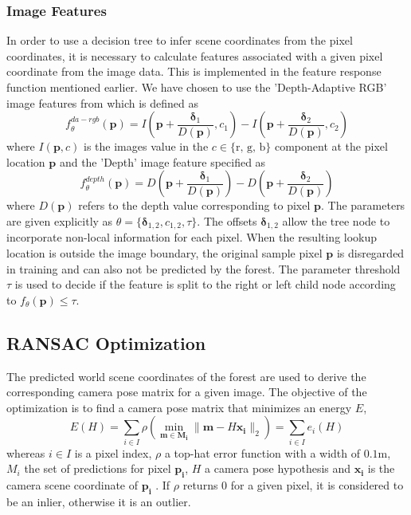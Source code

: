 \documentclass[final]{cvpr}
\begin{document}
\subsubsection{Image Features}
In order to use a decision tree to infer scene coordinates from the pixel coordinates,
it is necessary to calculate features associated with a given pixel coordinate from the
image data. This is implemented in the feature response function mentioned earlier.
We have chosen to use the 'Depth-Adaptive RGB' image features from \cite{shotton2013} which
is defined as
\begin{equation}
	f_{\theta}^{da-rgb}(\boldsymbol{p}) = I\left(\boldsymbol{p} + \frac{\boldsymbol{\delta}_1}{D(\boldsymbol{p})}, c_1\right)
	- I\left(\boldsymbol{p} + \frac{\boldsymbol{\delta}_2}{D(\boldsymbol{p})}, c_2\right)
\end{equation}
where $I(\boldsymbol{p}, c)$ is the images value in the $c \in \{\text{r, g, b}\}$ component at
the pixel location $\boldsymbol{p}$ and the 'Depth' image feature specified as
\begin{equation}
	f_{\theta}^{depth}(\boldsymbol{p}) = D\left(\boldsymbol{p} + \frac{\boldsymbol{\delta}_1}{D(\boldsymbol{p})}\right)
	- D\left(\boldsymbol{p} + \frac{\boldsymbol{\delta}_2}{D(\boldsymbol{p})}\right)
\end{equation}
where $D(\boldsymbol{p})$ refers to the depth value corresponding to pixel $\boldsymbol{p}$.
The parameters are given explicitly as $\theta = \{\boldsymbol{\delta}_{1,2}, c_{1,2}, \tau\}$. 
The offsets $\boldsymbol{\delta}_{1,2}$
allow the tree node to incorporate non-local information for each pixel. When the resulting
lookup location is outside the image boundary, the original sample pixel $\boldsymbol{p}$ is
disregarded in training and can also not be predicted by the forest. The parameter threshold 
$\tau$ is used to decide if the feature is split to the right or left child node according to 
$f_{\theta}(\boldsymbol{p}) \leq \tau$.


\subsection{RANSAC Optimization}
The predicted world scene coordinates of the forest are used to derive the corresponding camera pose matrix for a given image. 
The objective of the optimization is to find a camera pose matrix that minimizes an energy $E$,
\begin{equation}\label{energy_function}
	E(H) = \sum_{i \in I} \rho(\min_{\boldsymbol{m} \in \boldsymbol{M_{i}}} 
	\| \boldsymbol{m} - H \boldsymbol{x_{i}} \|_{2}) = \sum_{i \in I}e_{i}(H)
\end{equation}
whereas $i \in I$ is a pixel index,  $\rho$ a top-hat error function with a width of $0.1$m, $M_{i}$ 
the set of predictions for pixel $\boldsymbol{p_{i}}$, $H$ a camera pose hypothesis and $\boldsymbol{x_{i}}$ is the camera
scene coordinate of $\boldsymbol{p_{i}}$ \cite{shotton2013}. If $\rho$ returns $0$ for a given pixel, it is considered
to be an inlier, otherwise it is an outlier.
\end{document}
